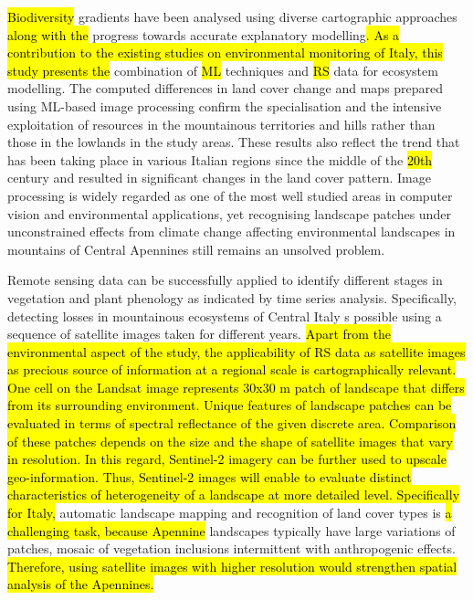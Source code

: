 \documentclass[jimaging,article,submit,pdftex,moreauthors]{Definitions/mdpi}
\begin{document}
\hl{Biodiversity} gradients have been analysed using diverse cartographic approaches \hl{along with the} progress towards accurate explanatory modelling\hl{. As a contribution to the existing studies on environmental monitoring of Italy, this study presents the} combination of \hl{ML} techniques and \hl{RS} data\hl{ }for ecosystem modelling. The computed differences in land cover change and maps prepared using ML-based image processing confirm the specialisation and the intensive exploitation of resources in the mountainous territories and hills rather than those in the lowlands in the study areas. These results also reflect the trend that has been taking place in various Italian regions since the middle of the \hl{20th} century and resulted in significant changes in the land cover pattern. Image processing is widely regarded as one of the most well studied areas in computer vision and environmental applications, yet recognising landscape patches under unconstrained effects from climate change affecting environmental landscapes in mountains of Central Apennines still remains an unsolved problem. 

Remote sensing data can be successfully applied to identify different stages in vegetation and plant phenology as indicated by time series analysis. Specifically, detecting losses in mountainous ecosystems of Central Italy s possible using a sequence of satellite images taken for different years. \hl{Apart from the environmental aspect of the study, the applicability of RS data as satellite images as precious source of information at a regional scale is cartographically relevant. One cell on the Landsat image represents 30x30 m patch of landscape that differs from its surrounding environment. Unique features of landscape patches can be evaluated in terms of spectral reflectance of the given discrete area.  Comparison of these patches depends on the size and the shape of satellite images that  vary in resolution. In this regard, Sentinel-2 imagery can be further used to upscale geo-information. Thus, Sentinel-2 images will enable to evaluate distinct characteristics of heterogeneity of a landscape at more detailed level. Specifically for Italy,} automatic landscape mapping and recognition of land cover types is \hl{a challenging task, because Apennine} landscapes typically have large variations of patches, mosaic of vegetation inclusions intermittent with anthropogenic effects. \hl{Therefore, using satellite images with higher resolution would strengthen spatial analysis of the Apennines.}
\end{document}
